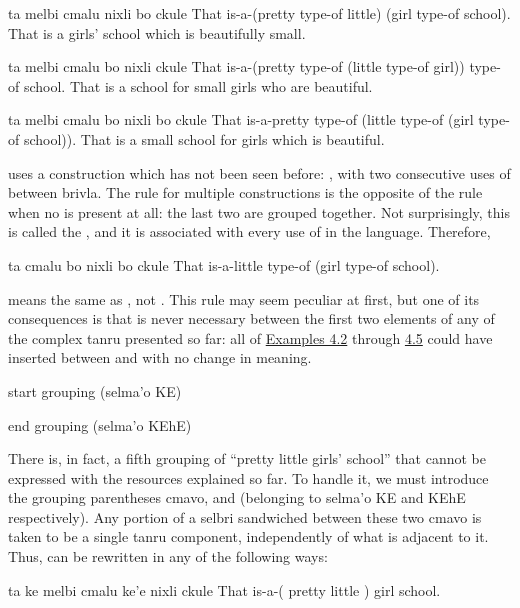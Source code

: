 \begin{example}
ta melbi cmalu nixli bo ckule\n
That is-a-(pretty type-of little) (girl type-of school).\n
That is a girls' school which is beautifully small.
\end{example}

\begin{example}
ta melbi cmalu bo nixli\n
\T	ckule\n
That is-a-(pretty type-of (little type-of girl))\n
\T	type-of school.\n
That is a school for small girls who are beautiful.
\end{example}

\begin{example}
ta melbi cmalu bo\n
\T	nixli bo ckule\n
That is-a-pretty type-of (little type-of\n
\T	(girl type-of school)).\n
That is a small school for girls which is beautiful.
\end{example}

 uses a construction which has
    not been seen before: , with two
    consecutive uses of  between brivla. The rule for
    multiple  constructions is the opposite of the rule when
    no  is present at all: the last two are grouped together.
    Not surprisingly, this is called the ,
    and it is associated with every use of  in the language.
    Therefore,
\begin{example}
ta cmalu bo nixli bo ckule\n
That is-a-little type-of (girl type-of school).
\end{example}

{\noindent}means the same as , not . This rule may seem peculiar at
    first, but one of its consequences is that  is never
    necessary between the first two elements of any of the complex
    tanru presented so far: all of \hyperref[html:e4d2]{Examples
    4.2} through \hyperref[html:e4d5]{4.5} could have 
    inserted between  and  with no change in
    meaning.



\begin{description}
\item[ke] start grouping (selma'o KE)
\item[ke'e] end grouping (selma'o KEhE)
\end{description}
    There is, in fact, a fifth grouping of ``pretty little girls'
    school'' that cannot be expressed with the resources explained
    so far. To handle it, we must introduce the grouping
    parentheses cmavo,  and  (belonging to selma'o KE
    and KEhE respectively). Any portion of a selbri sandwiched
    between these two cmavo is taken to be a single tanru
    component, independently of what is adjacent to it. Thus,  can be rewritten in any of the
    following ways:
\begin{example}
ta ke melbi cmalu ke'e nixli ckule\n
That is-a-( pretty little ) girl school.
\end{example}

